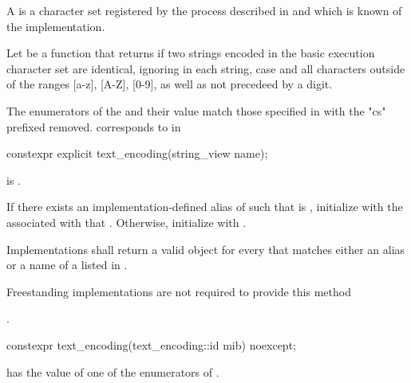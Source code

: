 \documentclass{wg21}
\begin{document}
\begin{addedblock}

\pnum A  is a character set registered by the process described in \cite{rfc2978} and which is known of the implementation.

\pnum Let  be a function that returns  if two strings encoded in the basic execution character set are identical, ignoring in each string, case and all characters outside of the ranges [a-z], [A-Z], [0-9], as well as  not precedeed by a digit.

\begin{note}
The enumerators of the  and their value match those specified in \cite{rfc3808} with the "cs" prefixed removed.  corresponds to  in \cite{rfc3808}
\end{note}

\begin{itemdecl}
constexpr explicit text_encoding(string_view name);
\end{itemdecl}

\begin{itemdescr}
    \preconditions {} is .
    
    \effects
    If there exists an implementation-defined alias  of  such that  is , initialize
     with the  associated with that . Otherwise, initialize  with .

    Implementations shall return a valid  object for every  that matches either an alias or a name of a  listed in \cite{rfc3808}.

\begin{note}
	Freestanding implementations are not required to provide this method
\end{note}

    \postconditions {}.
\end{itemdescr}


\begin{itemdecl}
constexpr text_encoding(text_encoding::id mib) noexcept;
\end{itemdecl}

\begin{itemdescr}
    \preconditions {}  has the value of one of the enumerators of .
    

\end{itemdescr}
\end{addedblock}
\end{document}
